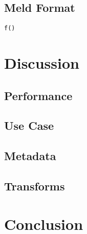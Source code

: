 \documentclass[11pt,a4paper,twocolumn]{article}
\begin{document}
\subsection{Meld Format}
\label{sec:meld_spec}

\lstset{language=python}
\begin{lstlisting}[frame=single]  % Start your code-block
f()
\end{lstlisting}

\section{Discussion}
\label{sec:discussion}

\subsection{Performance}


\subsection{Use Case}


\subsection{Metadata}


\subsection{Transforms}

\section{Conclusion}
\label{sec:conclusion}


\end{document}
